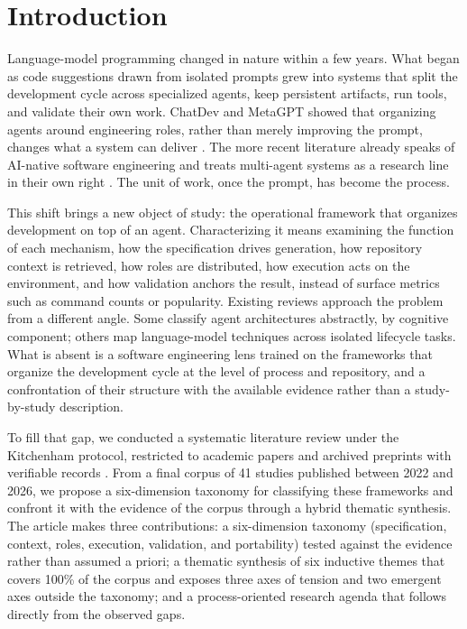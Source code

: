 \section{Introduction}

Language-model programming changed in nature within a few years. What began as code suggestions drawn from isolated prompts grew into systems that split the development cycle across specialized agents, keep persistent artifacts, run tools, and validate their own work. ChatDev and MetaGPT showed that organizing agents around engineering roles, rather than merely improving the prompt, changes what a system can deliver \cite{ChenQian2023,SiruiHong2023}. The more recent literature already speaks of AI-native software engineering and treats multi-agent systems as a research line in their own right \cite{hou2024llmse,AhmedEHassan2024,JundaHe2025}. The unit of work, once the prompt, has become the process.

This shift brings a new object of study: the operational framework that organizes development on top of an agent. Characterizing it means examining the function of each mechanism, how the specification drives generation, how repository context is retrieved, how roles are distributed, how execution acts on the environment, and how validation anchors the result, instead of surface metrics such as command counts or popularity. Existing reviews approach the problem from a different angle. Some classify agent architectures abstractly, by cognitive component; others map language-model techniques across isolated lifecycle tasks. What is absent is a software engineering lens trained on the frameworks that organize the development cycle at the level of process and repository, and a confrontation of their structure with the available evidence rather than a study-by-study description.

To fill that gap, we conducted a systematic literature review under the Kitchenham protocol, restricted to academic papers and archived preprints with verifiable records \cite{kitchenham2009slr}. From a final corpus of 41 studies published between 2022 and 2026, we propose a six-dimension taxonomy for classifying these frameworks and confront it with the evidence of the corpus through a hybrid thematic synthesis. The article makes three contributions: a six-dimension taxonomy (specification, context, roles, execution, validation, and portability) tested against the evidence rather than assumed a priori; a thematic synthesis of six inductive themes that covers 100\% of the corpus and exposes three axes of tension and two emergent axes outside the taxonomy; and a process-oriented research agenda that follows directly from the observed gaps.

